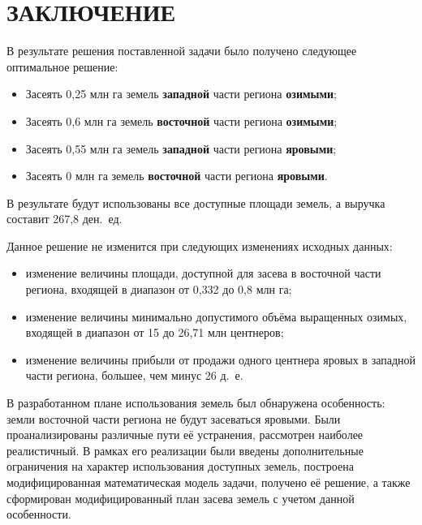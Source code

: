 \section*{ЗАКЛЮЧЕНИЕ}

В результате решения поставленной задачи было получено следующее оптимальное решение:
\begin{itemize}
\item Засеять 0{,}25 млн га земель \textbf{западной} части региона \textbf{озимыми};
\item Засеять 0{,}6 млн га земель \textbf{восточной} части региона \textbf{озимыми};
\item Засеять 0{,}55 млн га земель \textbf{западной} части региона \textbf{яровыми};
\item Засеять 0 млн га земель \textbf{восточной} части региона \textbf{яровыми}.
\end{itemize}

В результате будут использованы все доступные площади земель, а выручка составит 267{,}8 ден.~ед.

Данное решение не изменится при следующих изменениях исходных данных:
\begin{itemize}
  \item изменение величины площади, доступной для засева в восточной
    части региона, входящей в диапазон от 0{,}332 до 0{,}8 млн га;
  \item изменение величины минимально допустимого объёма выращенных озимых,
    входящей в диапазон от 15 до 26{,}71 млн центнеров;
  \item изменение величины прибыли от продажи одного центнера яровых
    в западной части региона, большее, чем минус 26 д.~е.
\end{itemize}

В разработанном плане использования земель был обнаружена особенность:
земли восточной части региона не будут засеваться яровыми.
Были проанализированы различные пути её устранения, рассмотрен наиболее реалистичный.
В рамках его реализации были введены дополнительные ограничения на характер 
использования доступных земель, построена модифицированная математическая модель задачи,
получено её решение, а также сформирован модифицированный план засева земель с учетом 
данной особенности.

\newpage

